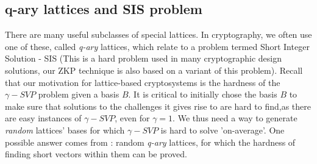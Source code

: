 \subsection{q-ary lattices and SIS problem}
\label{sub:q-ary lattices and SIS problem}
There are many useful subclasses of special lattices. In cryptography, we often
use one of these, called \emph{q-ary} lattices, which relate to a problem termed
Short Integer Solution - SIS (This is a hard problem used in many cryptographic
design solutions, our ZKP technique is also based on a variant of this problem). Recall
that our motivation for lattice-based cryptosystems is the hardness of the
$\gamma-SVP$ problem given a basis $B$. It is critical to initially chose the
basis $B$ to make sure that solutions to the challenges it gives rise to are hard to find,as
there are easy instances of $\gamma-SVP$, even for $\gamma=1$. We thus need a way to
generate \emph{random} lattices' bases for which $\gamma-SVP$ is hard to solve
'on-average'. One possible answer comes from \cite{ajtai1996generating}: random
\emph{q-ary} lattices, for which the hardness of finding short
vectors within them can be proved.

